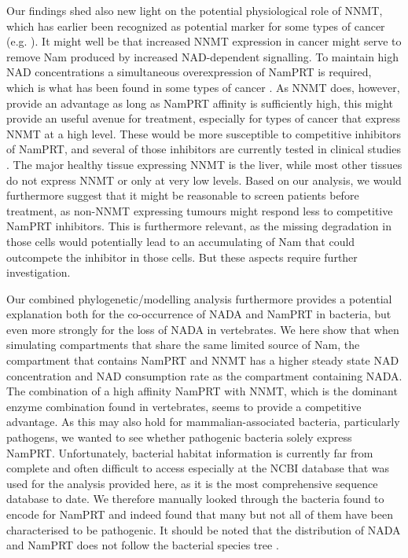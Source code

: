 Our findings shed also new light on the potential physiological role of NNMT, which has earlier been recognized as potential marker for some types of cancer (e.g. \cite{Okamura1998}). It might well be that increased NNMT expression in cancer might serve to remove Nam produced by increased NAD-dependent signalling. To maintain high NAD concentrations a simultaneous overexpression of NamPRT is required, which is what has been found in some types of cancer \cite{Bi2011,Wang2011}. As NNMT does, however, provide an advantage as long as NamPRT affinity is sufficiently high, this might provide an useful avenue for treatment, especially for types of cancer that express NNMT at a high level. These would be more susceptible to competitive inhibitors of NamPRT, and several of those inhibitors are currently tested in clinical studies \cite{Espindola-Netto2017} . The major healthy tissue expressing NNMT is the liver, while most other tissues do not express NNMT or only at very low levels. Based on our analysis, we would furthermore suggest that it might be reasonable to screen patients before treatment, as non-NNMT expressing tumours might respond less to competitive NamPRT inhibitors. This is furthermore relevant, as the missing degradation in those cells would potentially lead to an accumulating of Nam that could outcompete the inhibitor in those cells. But these aspects require further investigation.

Our combined phylogenetic/modelling analysis furthermore provides a potential explanation both for the co-occurrence of NADA and NamPRT in bacteria, but even more strongly for the loss of NADA in vertebrates. We here show that when simulating compartments that share the same limited source of Nam, the compartment that contains NamPRT and NNMT has a higher steady state NAD concentration and NAD consumption rate as the compartment containing NADA. The combination of a high affinity NamPRT with NNMT, which is the dominant enzyme combination found in vertebrates, seems to provide a competitive advantage. As this may also hold for mammalian-associated bacteria, particularly pathogens, we wanted to see whether pathogenic bacteria solely express NamPRT. Unfortunately, bacterial habitat information is currently far from complete and often difficult to access especially at the NCBI database that was used for the analysis provided here, as it is the most comprehensive sequence database to date. We therefore manually looked through the bacteria found to encode for NamPRT and indeed found that many but not all of them have been characterised to be pathogenic. It should be noted that the distribution of NADA and NamPRT does not follow the bacterial species tree \cite{Gazzaniga2009}.

